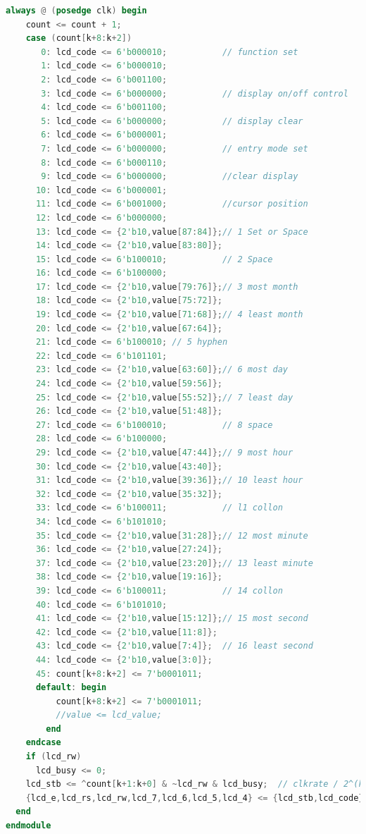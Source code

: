 \documentclass[12pt,a4paper,hidelinks]{article}            %
\begin{document}
\begin{lstlisting}[language=Verilog]
  always @ (posedge clk) begin
    count <= count + 1;
    case (count[k+8:k+2])
       0: lcd_code <= 6'b000010;           // function set
       1: lcd_code <= 6'b000010;
       2: lcd_code <= 6'b001100;
       3: lcd_code <= 6'b000000;           // display on/off control
       4: lcd_code <= 6'b001100;
       5: lcd_code <= 6'b000000;           // display clear
       6: lcd_code <= 6'b000001;
       7: lcd_code <= 6'b000000;           // entry mode set
       8: lcd_code <= 6'b000110;
       9: lcd_code <= 6'b000000;           //clear display
	  10: lcd_code <= 6'b000001;
      11: lcd_code <= 6'b001000;           //cursor position
      12: lcd_code <= 6'b000000;
      13: lcd_code <= {2'b10,value[87:84]};// 1 Set or Space
      14: lcd_code <= {2'b10,value[83:80]};
      15: lcd_code <= 6'b100010;           // 2 Space
      16: lcd_code <= 6'b100000;
      17: lcd_code <= {2'b10,value[79:76]};// 3 most month
      18: lcd_code <= {2'b10,value[75:72]};
      19: lcd_code <= {2'b10,value[71:68]};// 4 least month
      20: lcd_code <= {2'b10,value[67:64]};
	  21: lcd_code <= 6'b100010; // 5 hyphen
      22: lcd_code <= 6'b101101;
      23: lcd_code <= {2'b10,value[63:60]};// 6 most day
      24: lcd_code <= {2'b10,value[59:56]};
      25: lcd_code <= {2'b10,value[55:52]};// 7 least day
      26: lcd_code <= {2'b10,value[51:48]};
      27: lcd_code <= 6'b100010;           // 8 space
      28: lcd_code <= 6'b100000;
	  29: lcd_code <= {2'b10,value[47:44]};// 9 most hour
      30: lcd_code <= {2'b10,value[43:40]};
      31: lcd_code <= {2'b10,value[39:36]};// 10 least hour
      32: lcd_code <= {2'b10,value[35:32]};
      33: lcd_code <= 6'b100011;           // l1 collon
      34: lcd_code <= 6'b101010;
      35: lcd_code <= {2'b10,value[31:28]};// 12 most minute
      36: lcd_code <= {2'b10,value[27:24]};
	  37: lcd_code <= {2'b10,value[23:20]};// 13 least minute
      38: lcd_code <= {2'b10,value[19:16]};
      39: lcd_code <= 6'b100011;           // 14 collon
      40: lcd_code <= 6'b101010;
      41: lcd_code <= {2'b10,value[15:12]};// 15 most second
      42: lcd_code <= {2'b10,value[11:8]};
      43: lcd_code <= {2'b10,value[7:4]};  // 16 least second
      44: lcd_code <= {2'b10,value[3:0]};
	  45: count[k+8:k+2] <= 7'b0001011;
      default: begin
		  count[k+8:k+2] <= 7'b0001011;
		  //value <= lcd_value;
		end
    endcase
    if (lcd_rw)
      lcd_busy <= 0;
    lcd_stb <= ^count[k+1:k+0] & ~lcd_rw & lcd_busy;  // clkrate / 2^(k+2)
    {lcd_e,lcd_rs,lcd_rw,lcd_7,lcd_6,lcd_5,lcd_4} <= {lcd_stb,lcd_code};
  end
endmodule
\end{lstlisting}
\end{document}
